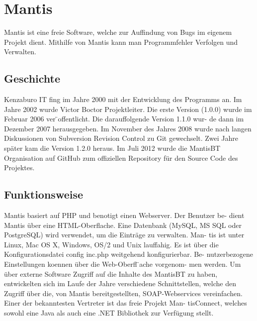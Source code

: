 \section{Mantis}
Mantis ist eine freie Software, welche zur Auffindung von Bugs im eigenem
Projekt dient. Mithilfe von Mantis kann man Programmfehler Verfolgen und
Verwalten.
\subsection{Geschichte}
Kenzaburo IT fing im Jahre 2000 mit der Entwicklung des Programms an.
Im Jahre 2002 wurde Victor Boctor Projektleiter. Die erste Version (1.0.0)
wurde im Februar 2006 ver ̈offentlicht. Die darauffolgende Version 1.1.0 wur-
de dann im Dezember 2007 herausgegeben. Im November des Jahres 2008
wurde nach langen Diskussionen von Subversion Revision Control zu Git
gewechselt. Zwei Jahre später kam die Version 1.2.0 heraus. Im Juli 2012
wurde die MantisBT Organisation auf GitHub zum offiziellen Repository
für den Source Code des Projektes.
\subsection{Funktionsweise}
Mantis basiert auf PHP und benotigt einen Webserver. Der Benutzer be-
dient Mantis über eine HTML-Oberflache. Eine Datenbank (MySQL, MS
SQL oder PostgreSQL) wird verwendet, um die Einträge zu verwalten. Man-
tis ist unter Linux, Mac OS X, Windows, OS/2 und Unix lauffahig. Es ist
über die Konfigurationsdatei config inc.php weitgehend konfigurierbar. Be-
nutzerbezogene Einstellungen koennen über die Web-Oberfl ̈ache vorgenom-
men werden. Um über externe Software Zugriff auf die Inhalte des MantisBT
zu haben, entwickelten sich im Laufe der Jahre verschiedene Schnittstellen,
welche den Zugriff über die, von Mantis bereitgestellten, SOAP-Webservices
vereinfachen. Einer der bekanntesten Vertreter ist das freie Projekt Man-
tisConnect, welches sowohl eine Java als auch eine .NET Bibliothek zur
Verfügung stellt.
